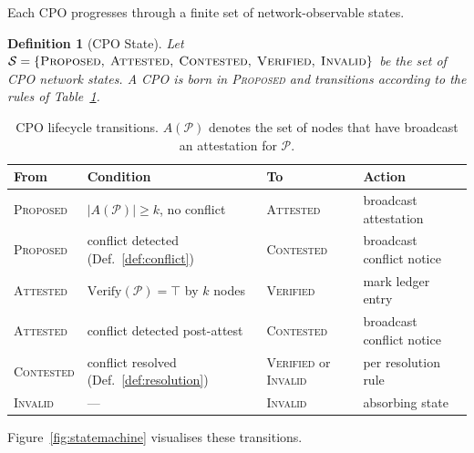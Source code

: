 \documentclass[11pt]{article}
\newtheorem{definition}{Definition}
\begin{document}
Each CPO progresses through a finite set of network-observable states.

\begin{definition}[CPO State]
\label{def:state}
Let $\mathcal{S} = \{\textsc{Proposed},\; \textsc{Attested},\;
\textsc{Contested},\; \textsc{Verified},\; \textsc{Invalid}\}$ be the set
of CPO network states.  A CPO is born in \textsc{Proposed} and transitions
according to the rules of Table~\ref{tab:transitions}.
\end{definition}

\begin{table}[h]
\centering
\caption{CPO lifecycle transitions.  $A(\mathcal{P})$ denotes the set of
nodes that have broadcast an attestation for $\mathcal{P}$.}
\label{tab:transitions}
\begin{tabular}{llll}
\toprule
\textbf{From} & \textbf{Condition} & \textbf{To} & \textbf{Action} \\
\midrule
\textsc{Proposed}  & $|A(\mathcal{P})| \geq k$, no conflict
                   & \textsc{Attested}  & broadcast attestation \\
\textsc{Proposed}  & conflict detected (Def.~\ref{def:conflict})
                   & \textsc{Contested} & broadcast conflict notice \\
\textsc{Attested}  & $\mathrm{Verify}(\mathcal{P}) = \top$ by $k$ nodes
                   & \textsc{Verified}  & mark ledger entry \\
\textsc{Attested}  & conflict detected post-attest
                   & \textsc{Contested} & broadcast conflict notice \\
\textsc{Contested} & conflict resolved (Def.~\ref{def:resolution})
                   & \textsc{Verified} or \textsc{Invalid} & per resolution rule \\
\textsc{Invalid}   & — & \textsc{Invalid} & absorbing state \\
\bottomrule
\end{tabular}
\end{table}

Figure~\ref{fig:statemachine} visualises these transitions.
\end{document}
